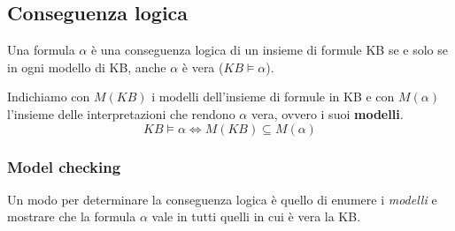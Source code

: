 \subsection{Conseguenza logica}
\begin{definition}
	Una formula $\alpha$ è una conseguenza logica di un insieme di formule KB se e solo se in ogni modello di KB, anche $\alpha$ è vera ($KB \models \alpha$).
\end{definition}
Indichiamo con $M(KB)$ i modelli dell'insieme di formule in KB e con $M(\alpha)$ l'insieme delle interpretazioni che rendono $\alpha$ vera, ovvero i suoi \textbf{modelli}.
\begin{equation}
	KB \models \alpha \Leftrightarrow M(KB) \subseteq M(\alpha)
\end{equation}

\subsubsection{Model checking}
Un modo per determinare la conseguenza logica è quello di enumere i \textit{modelli} e mostrare che la formula $\alpha$ vale in tutti quelli in cui è vera la KB.

